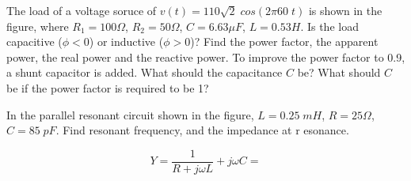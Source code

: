 \item The load of a voltage soruce of $v(t)=110\sqrt{2} \;cos(2\pi 60\;t)$
is shown in the figure, where $R_1=100\Omega$, $R_2=50\Omega$, $C=6.63\mu F$, 
$L=0.53 H$. Is the load capacitive ($\phi<0$) or inductive ($\phi>0$)?
Find the power factor, the apparent power, the real power and the
reactive power. To improve the power factor to 0.9, a shunt capacitor is added.
What should the capacitance $C$ be? What should $C$ be if the power factor is 
required to be 1?


% 
% 

\item In the parallel resonant circuit shown in the figure, $L=0.25\;mH$,
$R=25\Omega$, $C=85\;pF$. Find resonant frequency, and the impedance at r
esonance.


\[	Y=\frac{1}{R+j\omega L}+j\omega C=	\]



